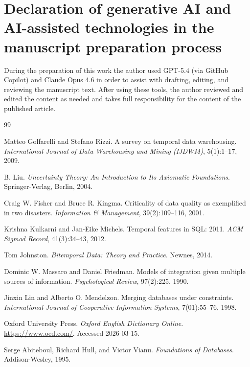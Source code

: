 \documentclass[a4paper,fleqn]{cas-sc}
\begin{document}
\section*{Declaration of generative AI and AI-assisted technologies in the manuscript preparation process}
During the preparation of this work the author used GPT-5.4 (via GitHub Copilot) and Claude Opus 4.6 in order to assist with drafting, editing, and reviewing the manuscript text. After using these tools, the author reviewed and edited the content as needed and takes full responsibility for the content of the published article.

\begin{thebibliography}{99}

Matteo Golfarelli and Stefano Rizzi.
\newblock A survey on temporal data warehousing.
\newblock \emph{International Journal of Data Warehousing and Mining (IJDWM)}, 5(1):1--17, 2009.

B. Liu.
\newblock \emph{Uncertainty Theory: An Introduction to Its Axiomatic Foundations}.
\newblock Springer-Verlag, Berlin, 2004.

Craig W. Fisher and Bruce R. Kingma.
\newblock Criticality of data quality as exemplified in two disasters.
\newblock \emph{Information \& Management}, 39(2):109--116, 2001.

Krishna Kulkarni and Jan-Eike Michels.
\newblock Temporal features in SQL: 2011.
\newblock \emph{ACM Sigmod Record}, 41(3):34--43, 2012.

Tom Johnston.
\newblock \emph{Bitemporal Data: Theory and Practice}.
\newblock Newnes, 2014.

Dominic W. Massaro and Daniel Friedman.
\newblock Models of integration given multiple sources of information.
\newblock \emph{Psychological Review}, 97(2):225, 1990.

Jinxin Lin and Alberto O. Mendelzon.
\newblock Merging databases under constraints.
\newblock \emph{International Journal of Cooperative Information Systems}, 7(01):55--76, 1998.

Oxford University Press.
\newblock \emph{Oxford English Dictionary Online}.
\newblock \url{https://www.oed.com/}. Accessed 2026-03-15.

Serge Abiteboul, Richard Hull, and Victor Vianu.
\newblock \emph{Foundations of Databases}.
\newblock Addison-Wesley, 1995.


\end{thebibliography}
\end{document}
